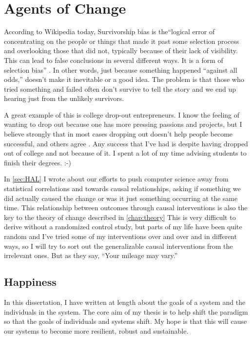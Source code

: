\chapter{Agents of Change}
\label{chap:agent}

According to Wikipedia today, Survivorship bias is the``logical error of concentrating on the people or things that made it past some selection process and overlooking those that did not, typically because of their lack of visibility. This can lead to false conclusions in several different ways. It is a form of selection bias'' \cite{wikipedia:survivorshipbias}. In other words, just because something happened ``against all odds,'' doesn't make it inevitable or a good idea. The problem is that those who tried something and failed often don't survive to tell the story and we end up hearing just from the unlikely survivors.

A great example of this is college drop-out entrepreneurs. I know the feeling of wanting to drop out because one has more pressing passions and projects, but I believe strongly that in most cases dropping out doesn't help people become successful, and others agree \cite{Zimmer:2013aa}. Any success that I've had is despite having dropped out of college and not because of it. I spent a lot of my time advising students to finish their degrees. :-)

In \autoref{sec:HAL} I wrote about our efforts to push computer science away from statistical correlations and towards causal relationships, asking if something we did actually caused the change or was it just something occurring at the same time. This relationship between outcomes through causal interventions is also the key to the theory of change described in \autoref{chap:theory} This is very difficult to derive without a randomized control study, but parts of my life have been quite random and I've tried some of my interventions over and over and in different ways, so I will try to sort out the generalizable causal interventions from the irrelevant ones. But as they say, ``Your mileage may vary.''

\section{Happiness}

In this dissertation, I have written at length about the goals of a system and the individuals in the system. The core aim of my thesis is to help shift the paradigm so that the goals of individuals and systems shift. My hope is that this will cause our systems to become more resilient, robust and sustainable.

